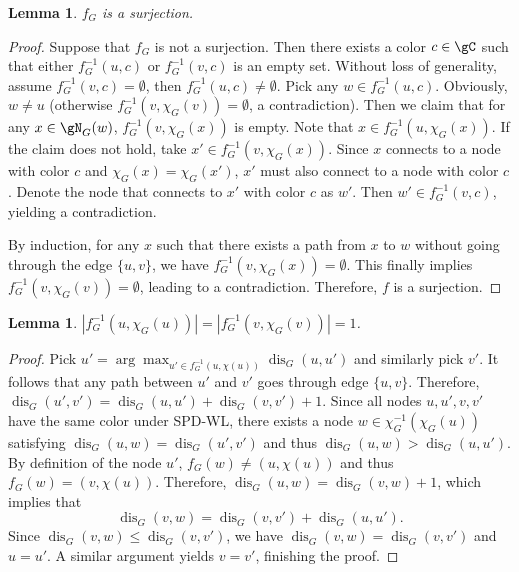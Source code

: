 \documentclass{article} %
\newtheorem{lemma}[theorem]{Lemma}
\newcommand*{\dis}{{\operatorname{dis}}}
\begin{document}
\begin{lemma}
\label{thm:spdwl_case2_1}
$f_G$ is a surjection.
\end{lemma}
\begin{proof}
Suppose that $f_G$ is not a surjection. Then there exists a color $c\in \gC$ such that either $f_G^{-1}(u,c)$ or $f_G^{-1}(v,c)$ is an empty set. Without loss of generality, assume $f_G^{-1}(v,c)=\emptyset$, then $f_G^{-1}(u,c)\neq\emptyset$. Pick any $w\in f_G^{-1}(u,c)$. Obviously, $w\neq u$ (otherwise $f_G^{-1}(v,\chi_G(v))= \emptyset$, a contradiction). Then we claim that for any $x\in\gN_G(w)$, $f_G^{-1}(v,\chi_G(x))$ is empty. Note that $x\in f_G^{-1}(u,\chi_G(x))$. If the claim does not hold, take $x'\in f_G^{-1}(v,\chi_G(x))$. Since $x$ connects to a node with color $c$ and $\chi_G(x)=\chi_G(x')$, $x'$ must also connect to a node with color $c$. Denote the node that connects to $x'$ with color $c$ as $w'$. Then $w'\in f_G^{-1}(v,c)$, yielding a contradiction.

By induction, for any $x$ such that there exists a path from $x$ to $w$ without going through the edge $\{u,v\}$, we have $f_G^{-1}(v,\chi_G(x))=\emptyset$. This finally implies $f_G^{-1}(v,\chi_G(v))=\emptyset$, leading to a contradiction. Therefore, $f$ is a surjection.
\end{proof}

\begin{lemma}
\label{thm:spdwl_case2_2}
$|f_G^{-1}(u,\chi_G(u))|=|f_G^{-1}(v,\chi_G(v))|=1$.
\end{lemma}
\begin{proof}
Pick $u'=\arg\max_{u'\in f_G^{-1}(u,\chi(u))}\dis_G(u,u')$ and similarly pick $v'$. It follows that any path between $u'$ and $v'$ goes through edge $\{u,v\}$. Therefore, $\dis_G(u',v')=\dis_G(u,u')+\dis_G(v,v')+1$. Since all nodes $u,u',v,v'$ have the same color under SPD-WL, there exists a node $w\in\chi_G^{-1}(\chi_G(u))$ satisfying $\dis_G(u,w)=\dis_G(u',v')$ and thus $\dis_G(u,w)>\dis_G(u,u')$. By definition of the node $u'$, $f_G(w)\neq (u,\chi(u))$ and thus $f_G(w)= (v,\chi(u))$. Therefore, $\dis_G(u,w)=\dis_G(v,w)+1$, which implies that $$\dis_G(v,w)=\dis_G(v,v')+\dis_G(u,u').$$
Since $\dis_G(v,w)\le \dis_G(v,v')$, we have $\dis_G(v,w)=\dis_G(v,v')$ and $u=u'$. A similar argument yields $v=v'$, finishing the proof. 
\end{proof}
\end{document}
